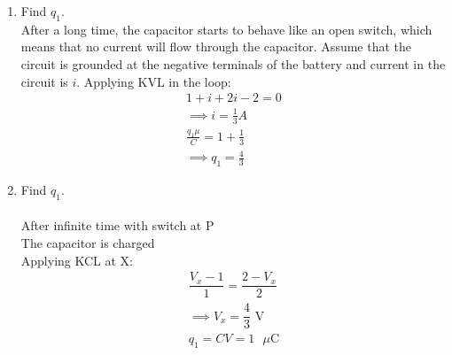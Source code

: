 \documentclass[journal,12pt,twocolumn]{IEEEtran}
\renewcommand\thesection{\arabic{section}}
\begin{document}
\begin{enumerate}[label=\arabic*.,ref=\thesection.\theenumi]
\item Find $q_1$.\\
\solution After a long time, the capacitor starts to behave like an open switch, which means that no current will flow through the capacitor. Assume that the circuit is grounded at the negative terminals of the battery and current in the circuit is $i$. Applying KVL in the loop:
	\begin{align}
		1+i+2i-2=0\\
		\implies i=\frac{1}{3}A\\
		\frac{q_1\mu}{C} = 1+\frac{1}{3}\\
		\implies q_1=\frac{4}{3}
	\end{align}

\item Find $q_1$.\\
\solution\\
After infinite time with switch at P\\
The capacitor is charged\\
Applying KCL at X:
\begin{align}
	\dfrac{V_x - 1}{1} = \dfrac{2 - V_x}{2}\\
	\implies V_x = \dfrac{4}{3} \text{ V}\\
	q_1 = CV = 1 \text{ $\mu$C}
\end{align}


\end{enumerate}
\end{document}
